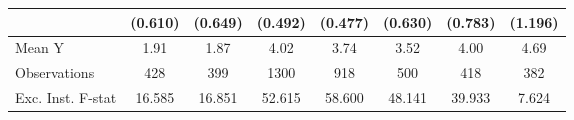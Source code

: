 {\begin{tabular}{l*{7}{c}}
            &     (0.610)         &     (0.649)         &     (0.492)         &     (0.477)         &     (0.630)         &     (0.783)         &     (1.196)         \\
\midrule
Mean Y      &        1.91         &        1.87         &        4.02         &        3.74         &        3.52         &        4.00         &        4.69         \\
Observations&         428         &         399         &        1300         &         918         &         500         &         418         &         382         \\
Exc. Inst. F-stat&      16.585         &      16.851         &      52.615         &      58.600         &      48.141         &      39.933         &       7.624         \\
\bottomrule
\end{tabular}
}
